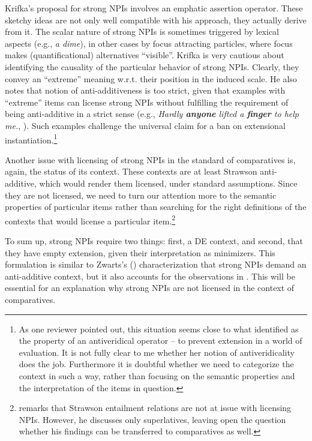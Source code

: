 \documentclass[output=paper,colorlinks,citecolor=brown,
]{langscibook}
\begin{document}
Krifka's \citeyearpar{krifka1995} proposal for strong NPIs involves an emphatic assertion operator. These sketchy ideas are not
only well compatible with his approach, they actually derive from it. The scalar nature of strong NPIs is sometimes
triggered by lexical aspects (e.g., \emph{a dime}), in other cases by focus attracting particles, where focus makes
(quantificational) alternatives “visible”. Krifka is very cautious about identifying the causality of the particular
behavior of strong NPIs. Clearly, they convey an ``extreme'' meaning w.r.t. their position in the induced scale. He also
notes that  notion of anti-additiveness is too strict, given that examples with ``extreme'' items
can license strong NPIs without fulfilling the requirement of being anti-additive in a strict sense (e.g., \textit{Hardly \textbf{anyone}
lifted a \textbf{finger} to help me.}, \citealt{krifka1995}). Such examples challenge the universal claim for a ban on extensional instantiation.\footnote{As one reviewer pointed out, this situation seems close to what \citet{giannak2007} identified
as the property of an antiveridical operator -- to prevent extension in a world of evaluation. It is not fully
clear to me whether her notion of antiveridicality does the job. Furthermore it is doubtful whether we need to categorize the context in such a way, rather than focusing on the semantic properties and the interpretation of the items in question.}

Another issue with licensing of strong NPIs in the standard of comparatives is, again, the
status of its context. These contexts are at least Strawson anti-additive, which would render them licensed, under standard assumptions. Since they are not licensed, we need to turn our attention more to the semantic properties of particular items rather than
searching for the right definitions of the contexts that would license a particular item.\footnote{\citet{gajewski2010} remarks
that Strawson entailment relations are not at issue with licensing NPIs. However, he discusses only superlatives, leaving open the
question whether his findings can be transferred to comparatives as well.}

To sum up, strong NPIs require two things: first, a DE context, and second, that they have empty extension, given their interpretation as minimizers. This formulation is similar to Zwarts's (\citeyear{zwarts1998}) characterization that strong NPIs demand an anti-additive context, but it also accounts for the observations in \citet{heim1984}. This will be essential for an explanation
why strong NPIs are not licensed in the context of comparatives.
\end{document}
